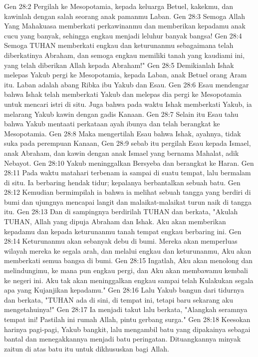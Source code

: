 Gen 28:2  Pergilah ke Mesopotamia, kepada keluarga Betuel, kakekmu, dan kawinlah dengan salah seorang anak pamanmu Laban.
Gen 28:3  Semoga Allah Yang Mahakuasa memberkati perkawinanmu dan memberikan kepadamu anak cucu yang banyak, sehingga engkau menjadi leluhur banyak bangsa!
Gen 28:4  Semoga TUHAN memberkati engkau dan keturunanmu sebagaimana telah diberkatinya Abraham, dan semoga engkau memiliki tanah yang kaudiami ini, yang telah diberikan Allah kepada Abraham!"
Gen 28:5  Demikianlah Ishak melepas Yakub pergi ke Mesopotamia, kepada Laban, anak Betuel orang Aram itu. Laban adalah abang Ribka ibu Yakub dan Esau.
Gen 28:6  Esau mendengar bahwa Ishak telah memberkati Yakub dan melepas dia pergi ke Mesopotamia untuk mencari istri di situ. Juga bahwa pada waktu Ishak memberkati Yakub, ia melarang Yakub kawin dengan gadis Kanaan.
Gen 28:7  Selain itu Esau tahu bahwa Yakub mentaati perkataan ayah ibunya dan telah berangkat ke Mesopotamia.
Gen 28:8  Maka mengertilah Esau bahwa Ishak, ayahnya, tidak suka pada perempuan Kanaan,
Gen 28:9  sebab itu pergilah Esau kepada Ismael, anak Abraham, dan kawin dengan anak Ismael yang bernama Mahalat, adik Nebayot.
Gen 28:10  Yakub meninggalkan Bersyeba dan berangkat ke Haran.
Gen 28:11  Pada waktu matahari terbenam ia sampai di suatu tempat, lalu bermalam di situ. Ia berbaring hendak tidur; kepalanya berbantalkan sebuah batu.
Gen 28:12  Kemudian bermimpilah ia bahwa ia melihat sebuah tangga yang berdiri di bumi dan ujungnya mencapai langit dan malaikat-malaikat turun naik di tangga itu.
Gen 28:13  Dan di sampingnya berdirilah TUHAN dan berkata, "Akulah TUHAN, Allah yang dipuja Abraham dan Ishak. Aku akan memberikan kepadamu dan kepada keturunanmu tanah tempat engkau berbaring ini.
Gen 28:14  Keturunanmu akan sebanyak debu di bumi. Mereka akan memperluas wilayah mereka ke segala arah, dan melalui engkau dan keturunanmu, Aku akan memberkati semua bangsa di bumi.
Gen 28:15  Ingatlah, Aku akan menolong dan melindungimu, ke mana pun engkau pergi, dan Aku akan membawamu kembali ke negeri ini. Aku tak akan meninggalkan engkau sampai telah Kulakukan segala apa yang Kujanjikan kepadamu."
Gen 28:16  Lalu Yakub bangun dari tidurnya dan berkata, "TUHAN ada di sini, di tempat ini, tetapi baru sekarang aku mengetahuinya!"
Gen 28:17  Ia menjadi takut lalu berkata, "Alangkah seramnya tempat ini! Pastilah ini rumah Allah, pintu gerbang surga."
Gen 28:18  Keesokan harinya pagi-pagi, Yakub bangkit, lalu mengambil batu yang dipakainya sebagai bantal dan menegakkannya menjadi batu peringatan. Dituangkannya minyak zaitun di atas batu itu untuk dikhususkan bagi Allah.
